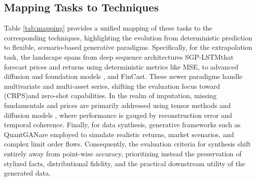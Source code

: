 \subsection{Mapping Tasks to Techniques}
Table \ref{tab:mapping} provides a unified mapping of these tasks to the corresponding techniques, highlighting the evolution from deterministic prediction to flexible, scenario-based generative paradigms. Specifically, for the extrapolation task, the landscape spans from deep sequence architectures SGP-LSTM\revdeldec{ ) }that forecast prices and returns using deterministic metrics like MSE, to advanced diffusion and foundation models , and FinCast\revdeldec{ )}. These newer paradigms handle multivariate and multi-asset series, shifting the evaluation focus toward (CRPS)and zero-shot capabilities. In the realm of imputation, missing fundamentals and prices are primarily addressed using tensor methods and diffusion models , where performance is gauged by reconstruction error and temporal coherence. Finally, for data synthesis, generative frameworks such as QuantGANare employed to simulate realistic returns, market scenarios, and complex limit order flows. Consequently, the evaluation criteria for synthesis shift entirely away from point-wise accuracy, prioritizing instead the preservation of stylized facts, distributional fidelity, and the practical downstream utility of the generated data.

